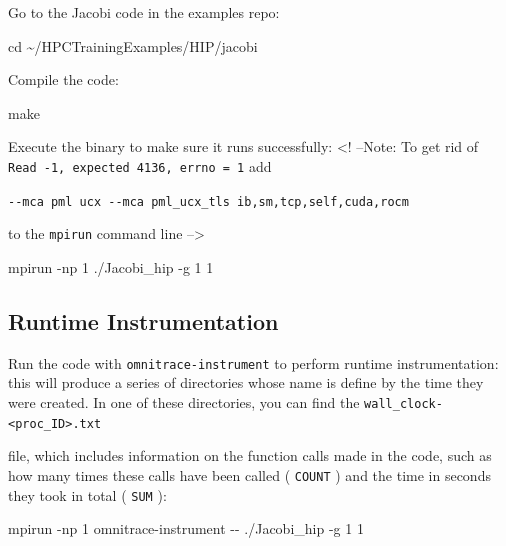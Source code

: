 \documentclass[
]{article}
\let\oldtexttt\texttt
\renewcommand{\texttt}[1]{
  \colorbox{Light}{\oldtexttt{#1}}
}
\newenvironment{Shaded}{}{}
\newcommand{\BuiltInTok}[1]{#1}
\newcommand{\ExtensionTok}[1]{#1}
\newcommand{\FunctionTok}[1]{\textcolor[rgb]{0.02,0.16,0.49}{#1}}
\newcommand{\NormalTok}[1]{#1}
\begin{document}
Go to the Jacobi code in the examples repo:

\begin{Shaded}
\begin{Highlighting}[]
\BuiltInTok{cd}\NormalTok{ \textasciitilde{}/HPCTrainingExamples/HIP/jacobi}
\end{Highlighting}
\end{Shaded}

Compile the code:

\begin{Shaded}
\begin{Highlighting}[]
\FunctionTok{make}
\end{Highlighting}
\end{Shaded}

Execute the binary to make sure it runs successfully: \textless! --Note:
To get rid of \texttt{Read\ -1,\ expected\ 4136,\ errno\ =\ 1} add
\texttt{-\/-mca\ pml\ ucx\ -\/-mca\ pml\_ucx\_tls\ ib,sm,tcp,self,cuda,rocm}
to the \texttt{mpirun} command line --\textgreater{}

\begin{Shaded}
\begin{Highlighting}[]
\ExtensionTok{mpirun}\NormalTok{ {-}np 1 ./Jacobi\_hip {-}g 1 1}
\end{Highlighting}
\end{Shaded}

\hypertarget{runtime-instrumentation}{%
\subsection{Runtime Instrumentation}\label{runtime-instrumentation}}

Run the code with \texttt{omnitrace-instrument} to perform runtime
instrumentation: this will produce a series of directories whose name is
define by the time they were created. In one of these directories, you
can find the \texttt{wall\_clock-\textless{}proc\_ID\textgreater{}.txt}
file, which includes information on the function calls made in the code,
such as how many times these calls have been called (\texttt{COUNT}) and
the time in seconds they took in total (\texttt{SUM}):

\begin{Shaded}
\begin{Highlighting}[]
\ExtensionTok{mpirun}\NormalTok{ {-}np 1 omnitrace{-}instrument {-}{-} ./Jacobi\_hip {-}g 1 1}
\end{Highlighting}
\end{Shaded}
\end{document}
